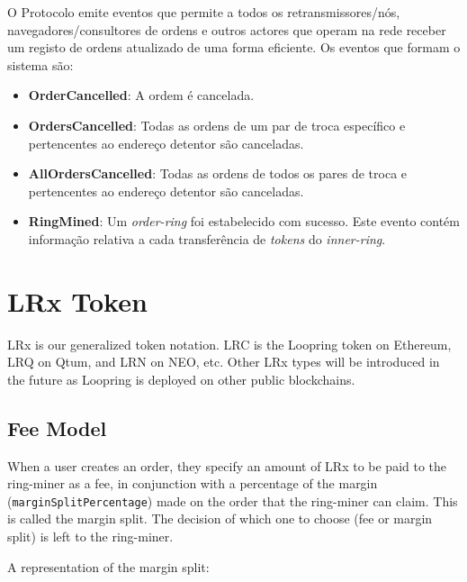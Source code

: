 \documentclass[UTF8,nofonts]{article}
\makeatletter
\newenvironment{figurehere}
 {\def\@captype{figure}}
 {}
\makeatother
\begin{document}
\begin{multicols}{2}
\begin{enumerate}
O Protocolo emite eventos que permite a todos os retransmissores/nós, navegadores/consultores de ordens e outros actores que operam na rede receber um registo de ordens atualizado de uma forma eficiente. Os eventos que formam o sistema são:

\begin{itemize}
	\item \textbf{OrderCancelled}: A ordem é cancelada.
	\item \textbf{OrdersCancelled}: Todas as ordens de um par de troca específico e pertencentes ao endereço detentor são canceladas.
	\item \textbf{AllOrdersCancelled}: Todas as ordens de todos os pares de troca e pertencentes ao endereço detentor são canceladas.
	\item \textbf{RingMined}: Um \textit{order-ring} foi estabelecido com sucesso. Este evento contém informação relativa a cada 
  transferência de \textit{tokens} do \textit{inner-ring}.
\end{itemize}


\section{LRx Token\label{sec:token}}
LRx is our generalized token notation. LRC is the Loopring token on Ethereum, LRQ on Qtum, and LRN on NEO, etc. Other LRx types will be introduced in the future as Loopring is deployed on other public blockchains.

\subsection{Fee Model\label{sec:fee_model}} 
When a user creates an order, they specify an amount of LRx to be paid to the ring-miner as a fee, in conjunction with a percentage of the margin (\verb|marginSplitPercentage|) made on the order that the ring-miner can claim. This is called the margin split. The decision of which one to choose (fee or margin split) is left to the ring-miner.

A representation of the margin split:

\begin{center}
\begin{figurehere}
\centering
{}
\end{figurehere}
\end{center}
\end{enumerate}
\end{multicols}
\end{document}
